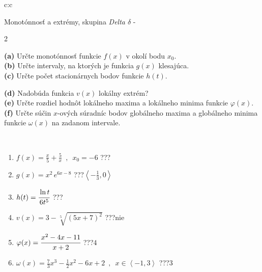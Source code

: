 \documentclass[10pt]{report}
\begin{document}
\newpage
\thispagestyle{empty}
\begin{tabular}{c:c}
\begin{minipage}[c][104.5mm][t]{0.5\linewidth}
\begin{center}
\vspace{7mm}
{\huge Monotónnosť a extrémy, skupina \textit{Delta $\delta$} -}\\[5mm]
\begin{minipage}{0.95\linewidth}
\begin{center}
{\small \begin{multicols}{2} \raggedright
\textbf{(a)} Určte monotónnosť funkcie \(f(x)\) v okolí bodu \(x_0\). \\[1mm]
\textbf{(b)} Určte intervaly, na ktorých je funkcia \(g(x)\) klesajúca. \\[1mm]
\textbf{(c)} Určte počet stacionárnych bodov funkcie \(h(t)\). \par \columnbreak
\textbf{(d)} Nadobúda funkcia \(v(x)\) lokálny extrém? \\[1mm]
\textbf{(e)} Určte rozdiel hodnôt lokálneho maxima a lokálneho minima funkcie \(\varphi(x)\). \\[1mm]
\textbf{(f)} Určte súčin \(x\)-ových súradníc bodov globálneho maxima a globálneho minima funkcie \(\omega(x)\) na zadanom intervale. \\[1mm]
\end{multicols}
}
\end{center}
\end{minipage}
\\[4mm]
\begin{minipage}{0.79\linewidth}
\begin{center}
\begin{varwidth}{\linewidth}
\begin{enumerate}
\normalsize
\item $f(x)=\frac{x}{5}+\frac{5}{x} \enspace , \enspace x_0=-6$\quad \dotfill\; ???\;\dotfill \quad {}
\item $g(x)=x^2\, e^{6x-8}$\quad \dotfill\; ???\;\dotfill \quad $\left\langle-\frac{1}{3} , 0\right\rangle$
\item $h(t)=\cfrac{\ln t}{6t^5}$\quad \dotfill\; ???\;\dotfill {}
\item $v(x)=3-\sqrt[5]{(5x+7)^2}$\quad \dotfill\; ???\;\dotfill \quad $\text{nie}$
\item $\varphi(x)=\cfrac{x^2-4x-11}{x+2}$\quad \dotfill\; ???\;\dotfill \quad $4$
\item $\omega(x)=\frac{7}{3}x^3-\frac{1}{2}x^2-6x+2 \enspace , \enspace x\in\left\langle-1 , 3\right\rangle$\quad \dotfill\; ???\;\dotfill \quad $3$

\end{enumerate}
\end{varwidth}
\end{center}
\end{minipage}
\end{center}
\end{minipage}
\end{tabular}
\end{document}
